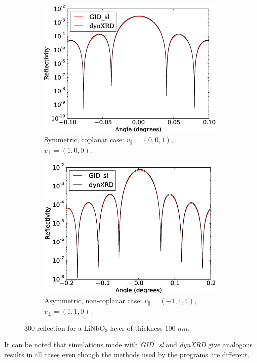 \documentclass[12pt,oneside,notitlepage,abstracton,a4paper]{scrartcl}
\begin{document}
\begin{figure}[h]
 \centering
 \begin{subfigure}[h]{0.49\textwidth}
  \includegraphics[width=\textwidth]{pics/test9.eps}
  \caption{Symmetric, coplanar case: $v_\parallel=(0, 0, 1)$, $v_\perp=(1,0,0)$.}
  \label{test9}
 \end{subfigure}
 \begin{subfigure}[h]{0.49\textwidth}
  \includegraphics[width=\textwidth]{pics/test11.eps}
  \caption{Asymmetric, non-coplanar case: $v_\parallel=(-1, 1, 4)$,\newline$v_\perp=(1,1,0)$.}
  \label{test11}
 \end{subfigure}
 \caption{$300$ reflection for a LiNbO$ _3$ layer of thickness $100\;nm$.}\label{testsLiNbO3}
\end{figure}
It can be noted that simulations made with \textit{GID\_sl} and \textit{dynXRD} give analogous results in all cases even though the methods used by the programs are different.
\end{document}
